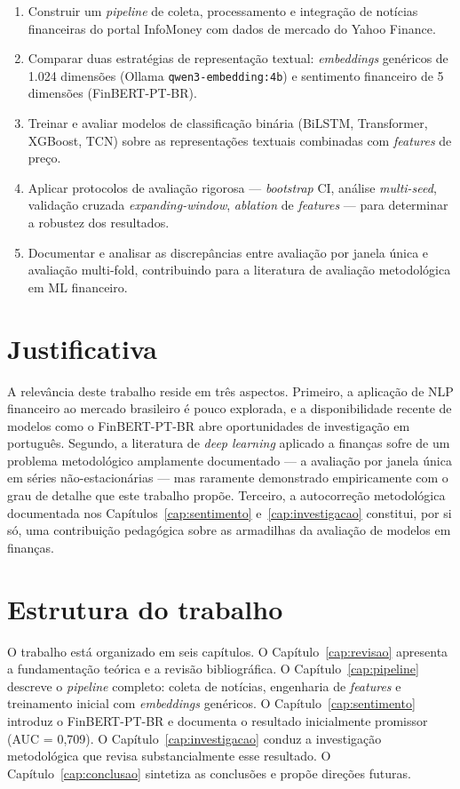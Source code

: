 \documentclass[
    12pt,
    openright,
    oneside,
    a4paper,
    english,
    brazil
]{abntex2}
\begin{document}
\begin{enumerate}
    \item Construir um \textit{pipeline} de coleta, processamento e integração de notícias financeiras do portal InfoMoney com dados de mercado do Yahoo Finance.
    \item Comparar duas estratégias de representação textual: \textit{embeddings} genéricos de 1.024 dimensões (Ollama \texttt{qwen3-embedding:4b}) e sentimento financeiro de 5 dimensões (FinBERT-PT-BR).
    \item Treinar e avaliar modelos de classificação binária (BiLSTM, Transformer, XGBoost, TCN) sobre as representações textuais combinadas com \textit{features} de preço.
    \item Aplicar protocolos de avaliação rigorosa --- \textit{bootstrap} CI, análise \textit{multi-seed}, validação cruzada \textit{expanding-window}, \textit{ablation} de \textit{features} --- para determinar a robustez dos resultados.
    \item Documentar e analisar as discrepâncias entre avaliação por janela única e avaliação multi-fold, contribuindo para a literatura de avaliação metodológica em ML financeiro.
\end{enumerate}

\section{Justificativa}

A relevância deste trabalho reside em três aspectos. Primeiro, a aplicação de NLP financeiro ao mercado brasileiro é pouco explorada, e a disponibilidade recente de modelos como o FinBERT-PT-BR abre oportunidades de investigação em português. Segundo, a literatura de \textit{deep learning} aplicado a finanças sofre de um problema metodológico amplamente documentado --- a avaliação por janela única em séries não-estacionárias \cite{bailey2014,lopezdeprado2018} --- mas raramente demonstrado empiricamente com o grau de detalhe que este trabalho propõe. Terceiro, a autocorreção metodológica documentada nos Capítulos~\ref{cap:sentimento} e~\ref{cap:investigacao} constitui, por si só, uma contribuição pedagógica sobre as armadilhas da avaliação de modelos em finanças.

\section{Estrutura do trabalho}

O trabalho está organizado em seis capítulos. O Capítulo~\ref{cap:revisao} apresenta a fundamentação teórica e a revisão bibliográfica. O Capítulo~\ref{cap:pipeline} descreve o \textit{pipeline} completo: coleta de notícias, engenharia de \textit{features} e treinamento inicial com \textit{embeddings} genéricos. O Capítulo~\ref{cap:sentimento} introduz o FinBERT-PT-BR e documenta o resultado inicialmente promissor (AUC = 0,709). O Capítulo~\ref{cap:investigacao} conduz a investigação metodológica que revisa substancialmente esse resultado. O Capítulo~\ref{cap:conclusao} sintetiza as conclusões e propõe direções futuras.
\end{document}

